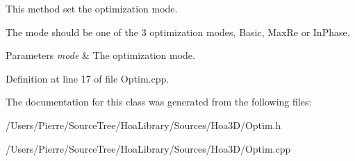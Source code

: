 This method set the optimization mode. 

The mode should be one of the 3 optimization modes, Basic, Max\-Re or In\-Phase.


\begin{DoxyParams}{Parameters}
{\em mode} & The optimization mode. \\
\hline
\end{DoxyParams}


Definition at line 17 of file Optim.\-cpp.



The documentation for this class was generated from the following files\-:\begin{DoxyCompactItemize}
\item 
/\-Users/\-Pierre/\-Source\-Tree/\-Hoa\-Library/\-Sources/\-Hoa3\-D/Optim.\-h\item 
/\-Users/\-Pierre/\-Source\-Tree/\-Hoa\-Library/\-Sources/\-Hoa3\-D/Optim.\-cpp\end{DoxyCompactItemize}
